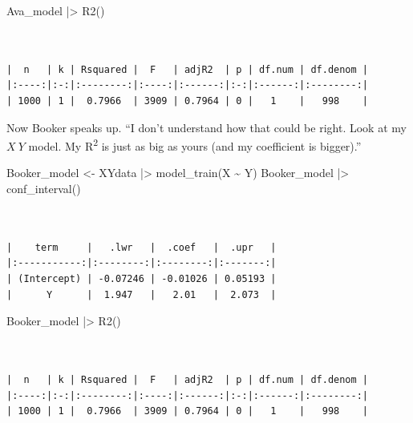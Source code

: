 \documentclass[
  letterpaper,
  DIV=11,
  numbers=noendperiod,
  oneside]{scrartcl}
\newenvironment{Shaded}{\begin{snugshade}}{\end{snugshade}}
\newcommand{\FunctionTok}[1]{\textcolor[rgb]{0.28,0.35,0.67}{#1}}
\newcommand{\NormalTok}[1]{\textcolor[rgb]{0.00,0.23,0.31}{#1}}
\newcommand{\OtherTok}[1]{\textcolor[rgb]{0.00,0.23,0.31}{#1}}
\newcommand{\SpecialCharTok}[1]{\textcolor[rgb]{0.37,0.37,0.37}{#1}}
\begin{document}
\begin{Shaded}
\begin{Highlighting}[]
\NormalTok{Ava\_model }\SpecialCharTok{|\textgreater{}} \FunctionTok{R2}\NormalTok{()}
\end{Highlighting}
\end{Shaded}

\begin{verbatim}


|  n   | k | Rsquared |  F   | adjR2  | p | df.num | df.denom |
|:----:|:-:|:--------:|:----:|:------:|:-:|:------:|:--------:|
| 1000 | 1 |  0.7966  | 3909 | 0.7964 | 0 |   1    |   998    |
\end{verbatim}

Now Booker speaks up. ``I don't understand how that could be right. Look
at my \(X ~ Y\) model. My R\textsuperscript{2} is just as big as yours
(and my coefficient is bigger).''

\begin{Shaded}
\begin{Highlighting}[]
\NormalTok{Booker\_model }\OtherTok{\textless{}{-}}\NormalTok{ XYdata }\SpecialCharTok{|\textgreater{}} \FunctionTok{model\_train}\NormalTok{(X }\SpecialCharTok{\textasciitilde{}}\NormalTok{ Y)}
\NormalTok{Booker\_model }\SpecialCharTok{|\textgreater{}} \FunctionTok{conf\_interval}\NormalTok{()}
\end{Highlighting}
\end{Shaded}

\begin{verbatim}


|    term     |   .lwr   |  .coef   |  .upr   |
|:-----------:|:--------:|:--------:|:-------:|
| (Intercept) | -0.07246 | -0.01026 | 0.05193 |
|      Y      |  1.947   |   2.01   |  2.073  |
\end{verbatim}

\begin{Shaded}
\begin{Highlighting}[]
\NormalTok{Booker\_model }\SpecialCharTok{|\textgreater{}} \FunctionTok{R2}\NormalTok{()}
\end{Highlighting}
\end{Shaded}

\begin{verbatim}


|  n   | k | Rsquared |  F   | adjR2  | p | df.num | df.denom |
|:----:|:-:|:--------:|:----:|:------:|:-:|:------:|:--------:|
| 1000 | 1 |  0.7966  | 3909 | 0.7964 | 0 |   1    |   998    |
\end{verbatim}
\end{document}

